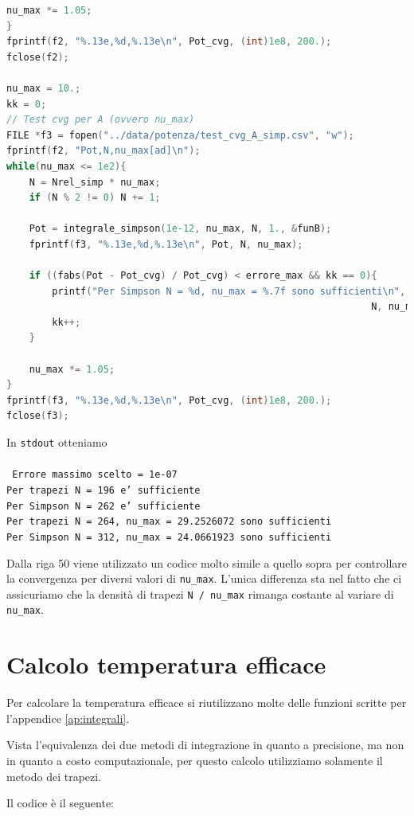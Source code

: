 \documentclass[a4paper, titlepage]{article}
\begin{document}
\begin{lstlisting}[language=C]
    nu_max *= 1.05;
}
fprintf(f2, "%.13e,%d,%.13e\n", Pot_cvg, (int)1e8, 200.);
fclose(f2);

nu_max = 10.;
kk = 0;
// Test cvg per A (ovvero nu_max)
FILE *f3 = fopen("../data/potenza/test_cvg_A_simp.csv", "w");
fprintf(f2, "Pot,N,nu_max[ad]\n");
while(nu_max <= 1e2){
    N = Nrel_simp * nu_max;
    if (N % 2 != 0) N += 1;

    Pot = integrale_simpson(1e-12, nu_max, N, 1., &funB);
    fprintf(f3, "%.13e,%d,%.13e\n", Pot, N, nu_max);

    if ((fabs(Pot - Pot_cvg) / Pot_cvg) < errore_max && kk == 0){
        printf("Per Simpson N = %d, nu_max = %.7f sono sufficienti\n",
                                                                N, nu_max);
        kk++;
    }

    nu_max *= 1.05;
}
fprintf(f3, "%.13e,%d,%.13e\n", Pot_cvg, (int)1e8, 200.);
fclose(f3);
\end{lstlisting}

In \texttt{stdout} otteniamo \\ \\
\texttt{
Errore massimo scelto = 1e-07 \\
Per trapezi N = 196 e' sufficiente \\
Per Simpson N = 262 e' sufficiente \\
Per trapezi N = 264, nu\_max = 29.2526072 sono sufficienti \\
Per Simpson N = 312, nu\_max = 24.0661923 sono sufficienti \\
}

Dalla riga 50 viene utilizzato un codice molto simile a quello sopra per
controllare la convergenza per diversi valori di \texttt{nu\_max}.
L'unica differenza sta nel fatto che ci assicuriamo che la densità di trapezi
\texttt{N / nu\_max} rimanga costante al variare di \texttt{nu\_max}.


\section{Calcolo temperatura efficace} \label{ap:Teff}

Per calcolare la temperatura efficace si riutilizzano molte delle funzioni
scritte per l'appendice \ref{ap:integrali}.

Vista l'equivalenza dei due metodi di integrazione in quanto a precisione, ma
non in quanto a costo computazionale, per questo calcolo utilizziamo solamente
il metodo dei trapezi.

Il codice è il seguente:
\end{document}
